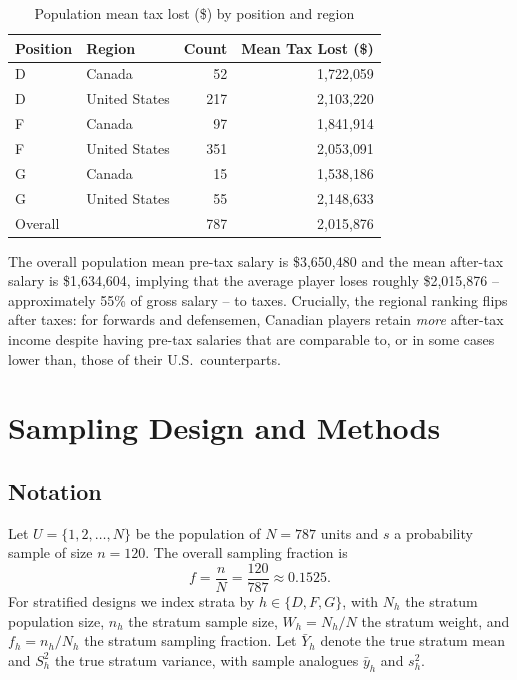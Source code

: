 \documentclass[12pt]{article}
\begin{document}
\begin{table}[H]
\centering
\caption{Population mean tax lost (\$) by position and region}
\label{tab:pop_taxlost}
\begin{tabular}{llrr}
\toprule
Position & Region & Count & Mean Tax Lost (\$) \\
\midrule
D & Canada        &  52 & 1{,}722{,}059 \\
D & United States & 217 & 2{,}103{,}220 \\
F & Canada        &  97 & 1{,}841{,}914 \\
F & United States & 351 & 2{,}053{,}091 \\
G & Canada        &  15 & 1{,}538{,}186 \\
G & United States &  55 & 2{,}148{,}633 \\
\midrule
Overall           & & 787 & 2{,}015{,}876 \\
\bottomrule
\end{tabular}
\end{table}

\noindent The overall population mean pre-tax salary is \$3{,}650{,}480 and the mean
after-tax salary is \$1{,}634{,}604, implying that the average player loses roughly
\$2{,}015{,}876 -- approximately 55\% of gross salary -- to taxes.
Crucially, the regional ranking flips after taxes: for forwards and defensemen,
Canadian players retain \emph{more} after-tax income despite having pre-tax salaries
that are comparable to, or in some cases lower than, those of their U.S.\ counterparts.

\newpage

\section{Sampling Design and Methods}
\label{sec:methods}

\subsection{Notation}

Let $U = \{1, 2, \ldots, N\}$ be the population of $N = 787$ units and $s$ a
probability sample of size $n = 120$.
The overall sampling fraction is
\[
  f = \frac{n}{N} = \frac{120}{787} \approx 0.1525.
\]
For stratified designs we index strata by $h \in \{D, F, G\}$, with $N_h$ the stratum
population size, $n_h$ the stratum sample size, $W_h = N_h / N$ the stratum weight,
and $f_h = n_h / N_h$ the stratum sampling fraction.
Let $\bar{Y}_h$ denote the true stratum mean and $S_h^2$ the true stratum variance,
with sample analogues $\bar{y}_h$ and $s_h^2$.
\end{document}
